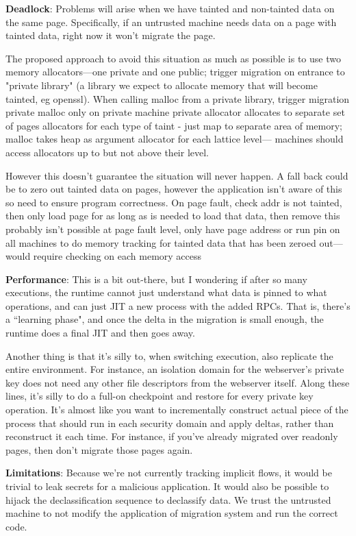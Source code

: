 \textbf{Deadlock}:
%
Problems will arise when we have tainted and non-tainted data on the same page.
%
Specifically, if an untrusted machine needs data on a page with tainted data,
right now it won't migrate the page.  
%

The proposed approach to avoid this situation as much as possible is to use two
memory allocators---one private and one public; trigger migration on entrance
to "private library" (a library we expect to allocate memory that will become
tainted, eg openssl).  
% 
When calling malloc from a private library, trigger migration private malloc
only on private machine private allocator allocates to separate set of pages
allocators for each type of taint - just map to separate area of memory; malloc
takes heap as argument allocator for each lattice level--- machines should
access allocators up to but not above their level.


However this doesn't guarantee the situation will never happen.
%
A fall back could be to zero out tainted data on pages, however the application
isn't aware of this so need to ensure program correctness.
%
On page fault, check addr is not tainted, then only load page for as long as is
needed to load that data, then remove this probably isn't possible at page
fault level, only have page address or run pin on all machines to do memory
tracking for tainted data that has been zeroed out---would require checking on
each memory access


\textbf{Performance}:
%
This is a bit out-there, but I wondering if after so many executions, the
runtime cannot just understand what data is pinned to what operations, and can
just JIT a new process with the added RPCs.
%
That is, there's a ``learning phase", and once the delta in the migration is
small enough, the runtime does a final JIT and then goes away.


Another thing is that it's silly to, when switching execution, also replicate
the entire environment.
%
For instance, an isolation domain for the webserver's private key does not
need any other file descriptors from the webserver itself.
%
Along these lines, it's silly to do a full-on checkpoint and restore for every
private key operation.
%
It's almost like you want to incrementally construct actual piece of the
process that should run in each security domain and apply deltas, rather than
reconstruct it each time.
%
For instance, if you've already migrated over readonly pages, then don't
migrate those pages again.


\textbf{Limitations}:
%
Because we're not currently tracking implicit flows, it would be trivial to
leak secrets for a malicious application.  
%
It would also be possible to hijack the declassification sequence to declassify
data.   We trust the untrusted machine to not modify the application of
migration system and run the correct code.


